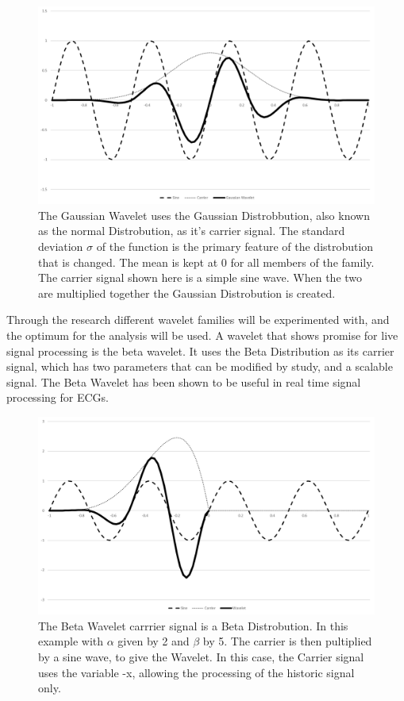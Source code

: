 \documentclass[journal=jacsat,manuscript=article]{achemso}
\begin{document}
\begin{figure}
	\centering
	\includegraphics[width=0.7\linewidth]{"Figures/Gassian Wavelet with Carrier"}
	\caption[Gaussian Wavelet]{The Gaussian Wavelet uses the Gaussian Distrobbution, also known as the normal Distrobution, as it's carrier signal.  The standard deviation $\sigma$ of the function is the primary feature of the distrobution that is changed.  The mean is kept at 0 for all members of the family.  The carrier signal shown here is a simple sine wave.  When the two are multiplied together the Gaussian Distrobution is created.}
	\label{fig:gaussian_wavelet}
\end{figure}

Through the research different wavelet families will be experimented with, and the optimum for the analysis will be used.  A wavelet that shows promise for live signal processing is the beta wavelet.  It uses the Beta Distribution as its carrier signal, which has two parameters that can be modified by study, and a scalable signal.  The Beta Wavelet has been shown to be useful in real time signal processing for ECGs.  

\begin{figure}
	\centering
	\includegraphics[width=0.7\linewidth]{"Figures/Beta Wavelet"}
	\caption[Beta Wavelet]{The Beta Wavelet carrrier signal is a Beta Distrobution.  In this example with $\alpha$ given by 2 and $\beta$ by 5.  The carrier is then pultiplied by a sine wave, to give the Wavelet.  In this case, the Carrier signal uses the variable -x, allowing the processing of the historic signal only.}
	\label{fig:beta_wavelet}
\end{figure}
\end{document}
